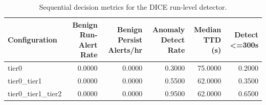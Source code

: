 \begin{table}[t]
\centering
\caption{Sequential decision metrics for the DICE run-level detector.}
\label{tab:dice_sequential_metrics}
\footnotesize
\begin{tabular}{lrrrrr}
\toprule
Configuration & Benign Run-Alert Rate & Benign Persist Alerts/hr & Anomaly Detect Rate & Median TTD (s) & Detect <=300s \\
\midrule
tier0 & 0.0000 & 0.0000 & 0.3000 & 75.0000 & 0.2000 \\
tier0_tier1 & 0.0000 & 0.0000 & 0.5500 & 62.0000 & 0.3500 \\
tier0_tier1_tier2 & 0.0000 & 0.0000 & 0.9500 & 62.0000 & 0.6500 \\
\bottomrule
\end{tabular}

\end{table}
